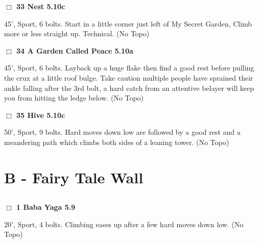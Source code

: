 \begin{multicols}{2}
\needspace{1.5cm}
\label{rt:Nest}
\colorbox{RoyalBlue!20}{
\parbox{0.95\linewidth}{
\hspace{-1ex}\textbf{$\Box$
33 Nest 5.10c  
}}}
\begin{adjustwidth}{1.3em}{}			
45', Sport, 6 bolts. Start in a little corner just left of My Secret Garden, Climb more or less straight up. Technical.
  (No Topo)
\end{adjustwidth}




\needspace{1.5cm}
\label{rt:A Garden Called Peace}
\colorbox{RoyalBlue!20}{
\parbox{0.95\linewidth}{
\hspace{-1ex}\textbf{$\Box$
34 A Garden Called Peace 5.10a  
}}}
\begin{adjustwidth}{1.3em}{}			
45', Sport, 6 bolts. Layback up a huge flake then find a good rest before pulling the crux at a little roof bulge. Take caution multiple people have sprained their ankle falling after the 3rd bolt, a hard catch from an attentive belayer will keep you from hitting the ledge below.
  (No Topo)
\end{adjustwidth}




\needspace{1.5cm}
\label{rt:Hive}
\colorbox{RoyalBlue!20}{
\parbox{0.95\linewidth}{
\hspace{-1ex}\textbf{$\Box$
35 Hive 5.10c  
}}}
\begin{adjustwidth}{1.3em}{}			
50', Sport, 9 bolts. Hard moves down low are followed by a good rest and a meandering path which climbs both sides of a leaning tower.
  (No Topo)
\end{adjustwidth}







\newpage

\section{B - Fairy Tale Wall}\label{sa:Fairy Tale Wall}




\needspace{1.5cm}
\subsection*{}\label{bf:}
	


\needspace{1.5cm}
\label{rt:Baba Yaga}
\colorbox{green!20}{
\parbox{0.95\linewidth}{
\hspace{-1ex}\textbf{$\Box$
1 Baba Yaga 5.9  
}}}
\begin{adjustwidth}{1.3em}{}			
20', Sport, 4 bolts. Climbing eases up after a few hard moves down low.
  (No Topo)
\end{adjustwidth}





\end{multicols}

